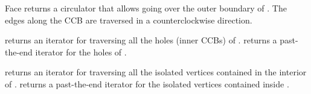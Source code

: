 \begin{ccRefClass}{Face}
    {returns a circulator that allows going over the outer boundary of
     \ccVar{}. The edges along the CCB are traversed in a counterclockwise
     direction.
     }
    
    {returns an iterator for traversing all the holes (inner CCBs) of
     \ccVar{}.}
\ccGlue
{}
    {returns a past-the-end iterator for the holes of \ccVar{}.}

    {returns an iterator for traversing all the isolated vertices
     contained in the interior of \ccVar{}.}
\ccGlue
{}
    {returns a past-the-end iterator for the isolated vertices 
     contained inside \ccVar{}.}

\end{ccRefClass}

\ccRefPageEnd
